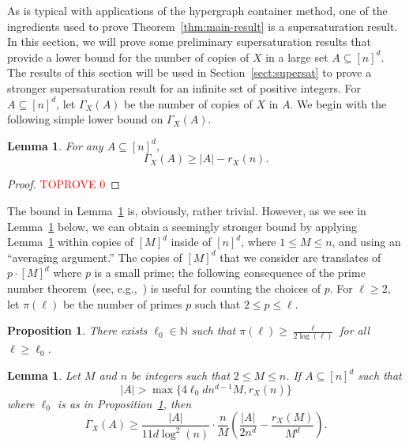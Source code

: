 \documentclass[12pt]{article}
\numberwithin{equation}{section}
\newtheorem{lem}[equation]{Lemma}
\newtheorem{prop}[equation]{Proposition}
\theoremstyle{definition}
\theoremstyle{remark}
\begin{document}
As is typical with applications of the hypergraph container method, one of the ingredients used to prove Theorem~\ref{thm:main-result} is a supersaturation result. In this section, we will prove some preliminary supersaturation results that provide a lower bound for the number of copies of $X$ in a large set $A \subseteq [n]^d$. The results of this section will be used in Section~\ref{sect:supersat} to prove a stronger supersaturation result for an infinite set of positive integers. For $A\subseteq [n]^d$, let $\Gamma_X(A)$ be the number of copies of $X$ in $A$. We begin with the following simple lower bound on $\Gamma_X(A)$. 

\begin{lem}
\label{lem:supersat1}
For any $A\subseteq [n]^d$, 
\[\Gamma_X(A)\geq |A|-r_X(n).\]
\end{lem}

\begin{proof}\textcolor{red}{TOPROVE 0}\end{proof}

The bound in Lemma~\ref{lem:supersat1} is, obviously, rather trivial. However, as we see in Lemma~\ref{lem:supersatPrime} below, we can obtain a seemingly stronger bound by applying Lemma~\ref{lem:supersat1} within copies of $[M]^d$ inside of $[n]^d$, where $1\leq M\leq n$, and using an ``averaging argument.'' The copies of $[M]^d$ that we consider are translates of $p\cdot [M]^d$ where $p$ is a small prime; the following consequence of the prime number theorem~(see, e.g.,~\cite{pnt}) is useful for counting the choices of $p$. For $\ell\geq2$, let $\pi(\ell)$ be the number of primes $p$ such that $2\leq p\leq \ell$.





\begin{prop}
\label{prop:PNT}
There exists $\ell_0\in \mathbb{N}$ such that $\pi(\ell)\geq \frac{\ell}{2\log(\ell)}$ for all $\ell\geq \ell_0$.
\end{prop}

\begin{lem}
\label{lem:supersatPrime}
Let $M$ and $n$ be integers such that $2\leq M\leq n$. If $A\subseteq [n]^d$ such that 
\begin{equation}\label{eq:supersat3condition}|A|> \max\{4\ell_0dn^{d-1}M, r_X(n)\}\end{equation}
where $\ell_0$ is as in Proposition~\ref{prop:PNT}, then 
\[\Gamma_X(A)\geq \frac{|A|}{11d\log^2(n)}\cdot \frac{n}{M}\left(\frac{|A|}{2n^d} - \frac{r_X (M)}{M^d}\right).\]
\end{lem}
\end{document}
